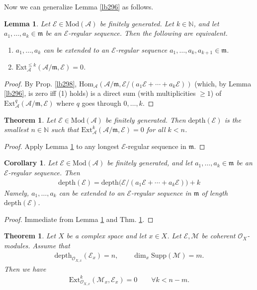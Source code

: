 \documentclass[12pt,b5paper,notitlepage]{report}
\theoremstyle{definition}
\theoremstyle{plain}
\newtheorem{thm}[df]{Theorem}
\newtheorem{co}[df]{Corollary}
\newtheorem{lm}[df]{Lemma}
\newcommand{\mc}{\mathcal}
\newcommand{\Hom}{\mathrm{Hom}}
\newcommand{\scr}{\mathscr}
\newcommand{\Nbb}{\mathbb N}
\newcommand{\Supp}{\mathrm{Supp}}
\newcommand{\Ext}{\mathrm{Ext}}
\newcommand{\Mod}{\mathrm{Mod}}
\newcommand{\mk}{\mathfrak m}
\newcommand{\depth}{\mathrm{depth}}
\numberwithin{equation}{section}
\begin{document}
Now we can generalize Lemma \ref{lb296} as follows.

\begin{lm}\label{lb299}
Let $\mc E\in\Mod(\mc A)$ be finitely generated. Let $k\in\Nbb$, and let $a_1,\dots,a_k\in\mk$ be an $\mc E$-regular sequence. Then the following are equivalent.
\begin{enumerate}[label=(\arabic*)]
\item $a_1,\dots,a_k$ can be extended to an $\mc E$-regular sequence $a_1,\dots,a_k,a_{k+1}\in\mk$.
\item $\Ext_{\mc A}^{\leq k}(\mc A/\mk,\mc E)=0$.
\end{enumerate}
\end{lm}


\begin{proof}
By Prop. \ref{lb298}, $\Hom_{\mc A}(\mc A/\mk,\mc E/(a_1\mc E+\cdots+a_k\mc E))$ (which, by Lemma \ref{lb296}, is zero iff (1) holds) is a direct sum (with multiplicities $\geq 1$) of $\Ext_{\mc A}^q(\mc A/\mk,\mc E)$ where $q$ goes through $0,\dots,k$. 
\end{proof}



\begin{thm}\label{lb300}
Let $\mc E\in\Mod(\mc A)$ be finitely generated. Then $\depth(\mc E)$ is the smallest $n\in\Nbb$ such that $\Ext_{\mc A}^k(\mc A/\mk,\mc E)=0$ for all $k<n$.
\end{thm}


\begin{proof}
Apply Lemma \ref{lb299} to any longest $\mc E$-regular sequence in $\mk$.
\end{proof}


\begin{co}\label{lb305}
Let $\mc E\in\Mod(\mc A)$ be finitely generated, and let $a_1,\dots,a_k\in\mk$ be an $\mc E$-regular sequence. Then
\begin{align*}
\depth(\mc E)=\depth\big(\mc E/(a_1\mc E+\cdots+a_k\mc E)\big)+k
\end{align*}
Namely, $a_1,\dots,a_k$ can be extended to an $\mc E$-regular sequence in $\mk$ of length $\depth(\mc E)$.
\end{co}

\begin{proof}
Immediate from Lemma \ref{lb299} and Thm. \ref{lb300}.
\end{proof}





\begin{thm}\label{lb303}
Let $X$ be a complex space and let $x\in X$. Let $\scr E,\scr M$ be coherent $\scr O_X$-modules. Assume that 
\begin{align*}
\depth_{\scr O_{X,x}}(\scr E_x)=n,  \qquad  \dim_x\Supp(\scr M)=m.
\end{align*}
Then we have
\begin{align}
\Ext_{\scr O_{X,x}}^k(\scr M_x,\scr E_x)=0    \qquad \forall k<n-m.   \label{eq129}
\end{align}
\end{thm}
\end{document}
